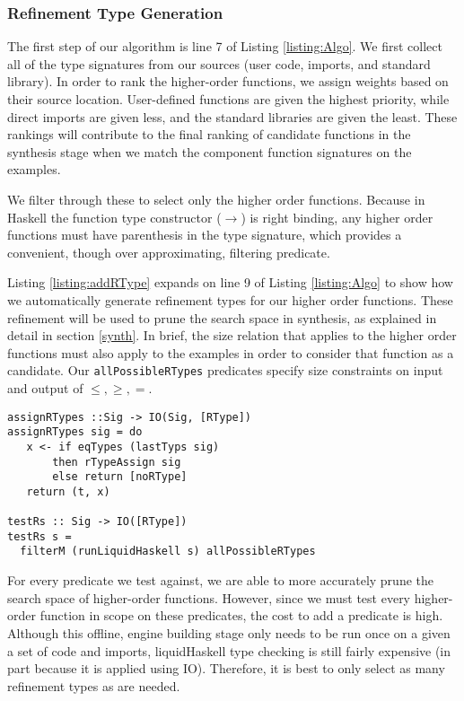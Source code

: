 \subsubsection{Refinement Type Generation}

The first step of our algorithm is line 7 of Listing \ref{listing:Algo}. We first collect all of the type signatures from our sources (user code, imports, and standard library). In order to rank the higher-order functions, we assign weights based on their source location. User-defined functions are given the highest priority, while direct imports are given less, and the standard libraries are given the least. These rankings will contribute to the final ranking of candidate functions in the synthesis stage when we match the component function signatures on the examples.

We filter through these to select only the higher order functions. Because in Haskell the function type constructor ($\to$) is right binding, any higher order functions must have parenthesis in the type signature, which provides a convenient, though over approximating, filtering predicate.

Listing \ref{listing:addRType} expands on line 9 of Listing \ref{listing:Algo} to show how we automatically generate refinement types for our higher order functions.
These refinement will be used to prune the search space in synthesis, as explained in detail in section \ref{synth}.
In brief, the size relation that applies to the higher order functions must also apply to the examples in order to consider that function as a candidate.
Our \texttt{allPossibleRTypes} predicates specify size constraints on input and output of $\leq,\geq,=$.

\begin{lstlisting}[caption=Adding refinement types to higher order functions,label=listing:addRType]
assignRTypes ::Sig -> IO(Sig, [RType])
assignRTypes sig = do
   x <- if eqTypes (lastTyps sig) 
       then rTypeAssign sig
       else return [noRType]
   return (t, x)

testRs :: Sig -> IO([RType])
testRs s =
  filterM (runLiquidHaskell s) allPossibleRTypes
\end{lstlisting}

For every predicate we test against, we are able to more accurately prune the search space of higher-order functions.
However, since we must test every higher-order function in scope on these predicates, the cost to add a predicate is high.
Although this offline, engine building stage only needs to be run once on a given a set of code and imports, liquidHaskell type checking is still fairly expensive (in part because it is applied using IO).
Therefore, it is best to only select as many refinement types as are needed.

